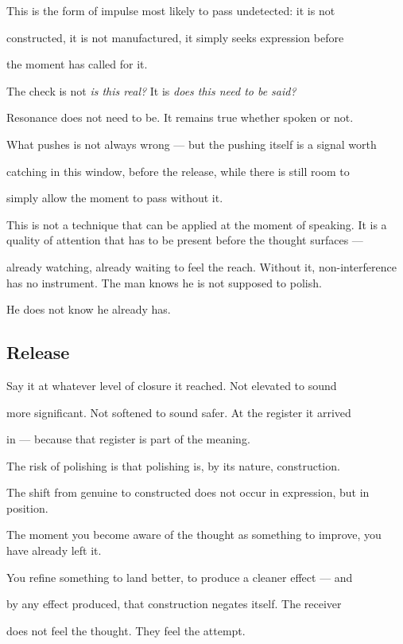 \documentclass[12pt, a4paper]{article}
\begin{document}
This is the form of impulse most likely to pass undetected: it is not

constructed, it is not manufactured, it simply seeks expression before

the moment has called for it.

The check is not \textit{is this real?} It is \textit{does this need to be said?}

Resonance does not need to be. It remains true whether spoken or not.

What pushes is not always wrong --- but the pushing itself is a signal worth

catching in this window, before the release, while there is still room to

simply allow the moment to pass without it.

This is not a technique that can be applied at the moment of speaking. It is a quality of attention that has to be present before the thought surfaces ---

already watching, already waiting to feel the reach. Without it, non-interference has no instrument. The man knows he is not supposed to polish.

He does not know he already has.


\subsection{Release}

Say it at whatever level of closure it reached. Not elevated to sound

more significant. Not softened to sound safer. At the register it arrived

in --- because that register is part of the meaning.

The risk of polishing is that polishing is, by its nature, construction.

The shift from genuine to constructed does not occur in expression, but in position.

The moment you become aware of the thought as something to improve, you have already left it.

You refine something to land better, to produce a cleaner effect --- and

by any effect produced, that construction negates itself. The receiver

does not feel the thought. They feel the attempt.
\end{document}
